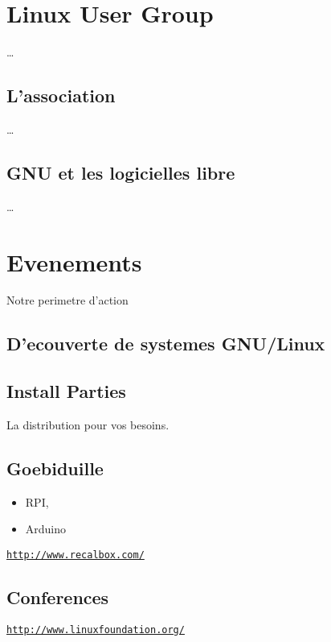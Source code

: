 
\section*{Linux User Group}

\dots

\subsection*{L'association}

\dots

\subsection*{GNU et les logicielles libre}

\dots

\section*{Evenements} 

Notre perimetre d'action

\subsection*{D'ecouverte de systemes GNU/Linux}


\subsection*{Install Parties}

La distribution pour vos besoins.

\subsection*{Goebiduille}

\begin{itemize}
\item RPI,
\item Arduino
\end{itemize}

\href{http://www.recalbox.com/}{\tt http://www.recalbox.com/}

\subsection*{Conferences}


\href{http://www.linuxfoundation.org/}{\tt http://www.linuxfoundation.org/}

